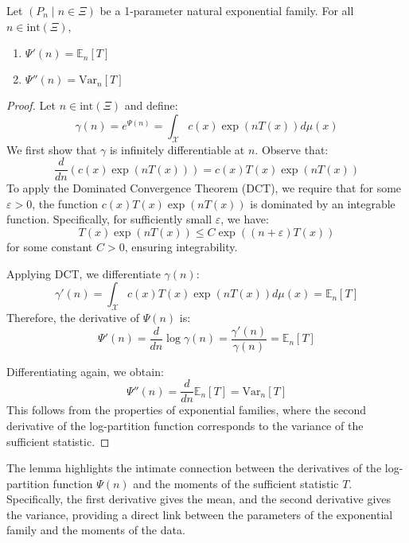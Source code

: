 \documentclass[open=any, 11pt,paper=A4]{scrreprt}
\begin{document}
\begin{lemma}
    Let \((P_n \mid n \in \Xi)\) be a 1-parameter natural exponential family. For all \(n \in \text{int}(\Xi)\),
    \begin{enumerate}
        \item \(\Psi'(n) = \mathbb{E}_n[T]\)
        \item \(\Psi''(n) = \text{Var}_n[T]\)
    \end{enumerate}
\end{lemma}

\begin{proof}
    Let \(n \in \text{int}(\Xi)\) and define:
    \[
    \gamma(n) = e^{\Psi(n)} = \int_{\mathcal{X}} c(x) \exp(n T(x)) d\mu(x)
    \]
    We first show that \(\gamma\) is infinitely differentiable at \(n\). Observe that:
    \[
    \frac{d}{dn} \left( c(x) \exp(n T(x)) \right) = c(x) T(x) \exp(n T(x))
    \]
    To apply the Dominated Convergence Theorem (DCT), we require that for some \(\varepsilon > 0\), the function \(c(x) T(x) \exp(n T(x))\) is dominated by an integrable function. Specifically, for sufficiently small \(\varepsilon\), we have:
    \[
    T(x) \exp(n T(x)) \leq C \exp((n + \varepsilon) T(x))
    \]
    for some constant \(C > 0\), ensuring integrability.

    Applying DCT, we differentiate \(\gamma(n)\):
    \[
    \gamma'(n) = \int_{\mathcal{X}} c(x) T(x) \exp(n T(x)) d\mu(x) = \mathbb{E}_n[T]
    \]
    Therefore, the derivative of \(\Psi(n)\) is:
    \[
    \Psi'(n) = \frac{d}{dn} \log \gamma(n) = \frac{\gamma'(n)}{\gamma(n)} = \mathbb{E}_n[T]
    \]

    Differentiating again, we obtain:
    \[
    \Psi''(n) = \frac{d}{dn} \mathbb{E}_n[T] = \text{Var}_n[T]
    \]
    This follows from the properties of exponential families, where the second derivative of the log-partition function corresponds to the variance of the sufficient statistic.
\end{proof}

\begin{remark}
    The lemma highlights the intimate connection between the derivatives of the log-partition function \(\Psi(n)\) and the moments of the sufficient statistic \(T\). Specifically, the first derivative gives the mean, and the second derivative gives the variance, providing a direct link between the parameters of the exponential family and the moments of the data.
\end{remark}
\end{document}
